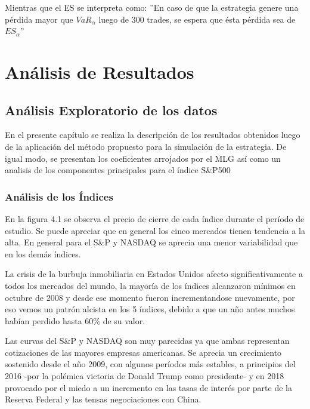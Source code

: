 \documentclass[a4paper,12pt]{Latex/Classes/PhDthesisPSnPDF}
\begin{document}
Mientras que el ES se interpreta como: ''En caso de que la estrategia genere una pérdida mayor que $VaR_{\alpha}$ luego de 300 trades, se espera que ésta pérdida sea de $ES_{\alpha}$''

\chapter{Análisis de Resultados}

\section{Análisis Exploratorio de los datos}

En el presente capítulo se realiza la descripción de los resultados obtenidos luego de la aplicación del método propuesto para la simulación de la estrategia. De igual modo, se presentan los coeficientes arrojados por el MLG así como un analisis de los componentes principales para el índice S\&P500 


\subsection{Análisis de los Índices}

En la figura 4.1 se observa el precio de cierre de cada índice durante el período de estudio. Se puede apreciar que en general los cinco mercados tienen tendencia a la alta. En general para el S\&P y NASDAQ se aprecia una menor variabilidad que en los demás índices.

La crisis de la burbuja inmobiliaria en Estados Unidos afecto significativamente a todos los mercados del mundo, la mayoría de los índices alcanzaron mínimos en octubre de 2008 y desde ese momento fueron incrementandose nuevamente, por eso vemos un patrón alcista en los 5 índices, debido a que un año antes muchos habían perdido hasta 60\% de su valor.

Las curvas del S\&P y NASDAQ son muy parecidas ya que ambas representan cotizaciones de las mayores empresas americanas. Se aprecia un crecimiento sostenido desde el año 2009, con algunos períodos más estables, a principios del 2016 -por la polémica victoria de Donald Trump como presidente- y en 2018 provocado por el miedo a un incremento en las tasas de interés por parte de la Reserva Federal y las tensas negociaciones con China.
\end{document}
